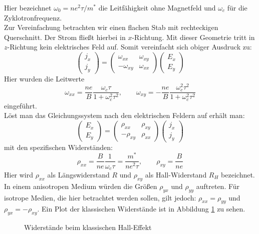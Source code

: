 Hier bezeichnet $\omega_0 = n e^2 \tau / m^*$ die Leitfähigkeit ohne Magnetfeld
und $\omega_c$ für die Zyklotronfrequenz.\\
Zur Vereinfachung betrachten wir einen flachen Stab mit rechteckigen Querschnitt.
Der Strom fließt hierbei in $x$-Richtung. Mit dieser Geometrie tritt in
$z$-Richtung kein elektrisches Feld auf. Somit vereinfacht sich obiger Ausdruck zu:
\[
    \begin{pmatrix}
        j_x \\ j_y
    \end{pmatrix}
    = \begin{pmatrix}
         \omega_{xx} & \omega_{xy} \\
        -\omega_{xy} & \omega_{xx}
      \end{pmatrix}
      \begin{pmatrix}
          E_x \\ E_y
      \end{pmatrix}
\]
Hier wurden die Leitwerte
\[
    \omega_{xx} = \frac{ne}{B} \frac{\omega_c \tau}{1+\omega_c^2 \tau^2}, \qquad
    \omega_{xy} = -\frac{ne}{B} \frac{\omega_c^2 \tau^2}{1+\omega_c^2 \tau^2}
\]
eingeführt.\\
Löst man das Gleichungssystem nach den elektrischen Feldern auf erhält man:
\[
    \begin{pmatrix} E_x \\ E_y \end{pmatrix}
    = \begin{pmatrix}
         \rho_{xx} & \rho_{xy} \\
        -\rho_{xy} & \rho_{xx} 
      \end{pmatrix}
      \begin{pmatrix}
          j_x \\ j_y
      \end{pmatrix}
\]
mit den spezifischen Widerständen:
\[
    \rho_{xx} = \frac{B}{ne} \frac{1}{\omega_c \tau} = \frac{m^*}{ne^2\tau}, \qquad
    \rho_{xy} = \frac{B}{ne}
\]
Hier wird $\rho_{xx}$ als Längswiderstand $R$ und $\rho_{xy}$ als Hall-Widerstand
$R_H$ bezeichnet.
In einem anisotropen Medium würden die Größen $\rho_{yx}$ und $\rho_{yy}$
auftreten. Für isotrope Medien, die hier betrachtet werden sollen, gilt jedoch:
$\rho_{xx} = \rho_{yy}$ und $\rho_{yx} = - \rho_{xy}$. Ein Plot der klassischen
Widerstände ist in Abbildung \ref{Abb:klassisch} zu sehen.
\begin{figure}
    \centering
    
    \caption{Widerstände beim klassischen Hall-Effekt}
    \label{Abb:klassisch}
\end{figure}

